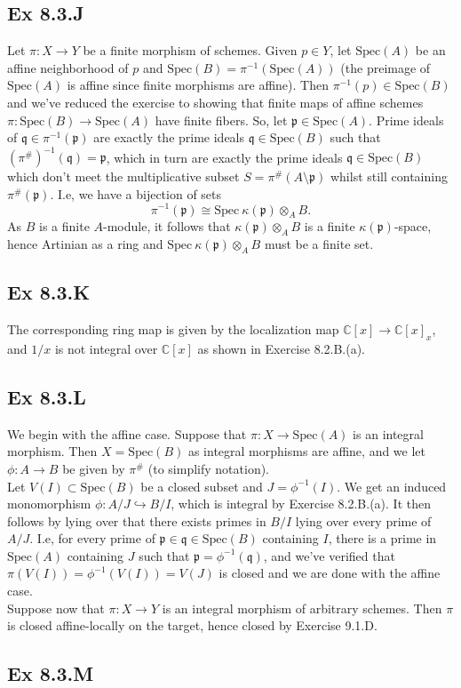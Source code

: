 \documentclass{article}
\theoremstyle{definition}
\newcommand{\C}{\mathbb{C}}
\newcommand{\Spec}{\text{Spec}}
\begin{document}
\subsection*{Ex 8.3.J}

Let $\pi : X \to Y$ be a finite morphism of schemes. Given $p \in Y$, let
$\Spec(A)$ be an affine neighborhood of $p$ and $\Spec(B) = \pi^{-1}(\Spec(A))$
(the preimage of $\Spec(A)$ is affine since finite morphisms are affine). Then
$\pi^{-1}(p) \in \Spec(B)$ and we've reduced the exercise to showing that
finite maps of affine schemes $\pi : \Spec(B) \to \Spec(A)$ have finite fibers.
So, let $\mathfrak{p} \in \Spec(A)$. Prime ideals of $\mathfrak{q} \in
\pi^{-1}(\mathfrak{p})$ are exactly the prime ideals $\mathfrak{q} \in
\Spec(B)$ such that $(\pi^{\#})^{-1}(\mathfrak{q}) = \mathfrak{p}$, which in
turn are exactly the prime ideals $\mathfrak{q} \in \Spec(B)$ which don't meet
the multiplicative subset $S = \pi^{\#}(A \setminus \mathfrak{p})$ whilst still
containing $\pi^{\#}(\mathfrak{p})$. I.e, we have a bijection of sets
\[
    \pi^{-1}(\mathfrak{p}) \cong \Spec\ \kappa(\mathfrak{p}) \otimes_{A} B.
\]
As $B$ is a finite $A$-module, it follows that $\kappa(\mathfrak{p})
\otimes_{A} B$ is a finite $\kappa(\mathfrak{p})$-space, hence Artinian as a
ring and $\Spec\ \kappa(\mathfrak{p}) \otimes_{A} B$ must be a finite set.

\subsection*{Ex 8.3.K}

The corresponding ring map is given by the localization map $\C[x] \to
\C[x]_{x}$, and $1/x$ is not integral over $\C[x]$ as shown in Exercise
8.2.B.(a).

\subsection*{Ex 8.3.L}

We begin with the affine case. Suppose that $\pi : X \to \Spec(A)$ is an
integral morphism. Then $X = \Spec(B)$ as integral morphisms are affine, and we
let $\phi : A \to B$ be given by $\pi^{\#}$ (to simplify notation). \\

Let $V(I) \subset \Spec(B)$ be a closed subset and $J = \phi^{-1}(I)$. We get
an induced monomorphism $\phi : A/J \hookrightarrow B/I$, which is integral by
Exercise 8.2.B.(a). It then follows by lying over that there exists primes in
$B/I$ lying over every prime of $A/J$. I.e, for every prime of $\mathfrak{p}
\in \mathfrak{q} \in \Spec(B)$ containing $I$, there is a prime in $\Spec(A)$
containing $J$ such that $\mathfrak{p} = \phi^{-1}(\mathfrak{q})$, and we've
verified that $\pi(V(I)) = \phi^{-1}(V(I)) = V(J)$ is closed and we are done
with the affine case. \\

Suppose now that $\pi : X \to Y$ is an integral morphism of arbitrary schemes.
Then $\pi$ is closed affine-locally on the target, hence closed by Exercise
9.1.D.

\subsection*{Ex 8.3.M}
\end{document}
